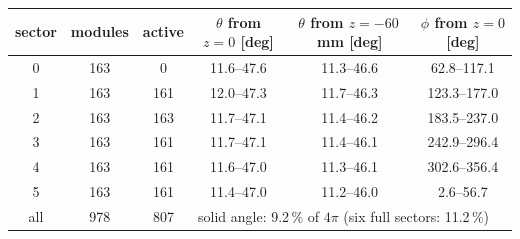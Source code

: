 \begin{tabular}{@{}c c c c c c@{}}
\toprule
sector & modules & active & $\theta$ from $z=0$ [deg] & $\theta$ from $z=-60$\,mm [deg] & $\phi$ from $z=0$ [deg] \\
\midrule
0 & 163 & 0 & 11.6--47.6 & 11.3--46.6 & 62.8--117.1 \\
1 & 163 & 161 & 12.0--47.3 & 11.7--46.3 & 123.3--177.0 \\
2 & 163 & 163 & 11.7--47.1 & 11.4--46.2 & 183.5--237.0 \\
3 & 163 & 161 & 11.7--47.1 & 11.4--46.1 & 242.9--296.4 \\
4 & 163 & 161 & 11.6--47.0 & 11.3--46.1 & 302.6--356.4 \\
5 & 163 & 161 & 11.4--47.0 & 11.2--46.0 & 2.6--56.7 \\
\midrule
all & 978 & 807 & \multicolumn{3}{l}{solid angle: 9.2\,\% of $4\pi$ (six full sectors: 11.2\,\%)} \\
\bottomrule
\end{tabular}
